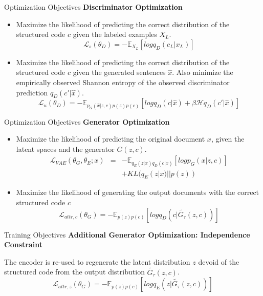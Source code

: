 \documentclass{beamer}
\begin{document}
\begin{frame}{Optimization Objectives}
  \textbf{Discriminator Optimization} 

  \begin{itemize}
    \item Maximize the likelihood of predicting the correct distribution of the structured code $c$ given the labeled examples $X_L$.
    \begin{equation*}
      \mathcal{L}_s(\theta_D) = - \mathbb{E}_{X_L}[log q_D(c_L|x_L)]
    \end{equation*}
    \item Maximize the likelihood of predicting the correct distribution of the structured code $c$ given the generated sentences $\hat{x}$. Also minimize the empirically observed Shannon entropy of the observed discriminator prediction $q_D(c'|\hat{x})$.
    \begin{equation*}
      \mathcal{L}_u(\theta_D) = - \mathbb{E}_{p_G(\hat{x}|z,c)p(z)p(c)} 
      [log q_D(c|\hat{x}) + \beta \mathcal{H} q_D(c'|\hat{x})]
    \end{equation*}
  \end{itemize}
\end{frame}

\begin{frame}{Optimization Objectives}
  \textbf{Generator Optimization}

  \begin{itemize}
    \item Maximize the likelihood of predicting the original document $x$, given the latent spaces and the generator $G(z,c)$.
      \begin{eqnarray*}
        \mathcal{L}_{VAE}(\theta_G, \theta_E; x) &=& 
        - \mathbb{E}_{q_E(z|x)q_D(c|x)}[log p_G(x|z,c)] \\ & & 
        + KL(q_E(z|x)||p(z))
      \end{eqnarray*}
    \item Maximize the likelihood of generating the output documents with the correct structured code $c$
    \begin{equation*}
      \mathcal{L}_{attr, c}(\theta_G) = - \mathbb{E}_{p(z)p(c)} 
      [log q_D(c|\tilde{G_{\tau}}(z,c))]
    \end{equation*}
  \end{itemize}
\end{frame}

\begin{frame}{Training Objectives}
  \textbf{Additional Generator Optimization: Independence Constraint}
  
  The encoder is re-used to regenerate the latent distribution $z$ devoid of the structured code from the output distribution $\tilde{G_{\tau}}(z,c)$. 
  \begin{equation*}
    \mathcal{L}_{attr, z}(\theta_G) = - \mathbb{E}_{p(z)p(c)} 
    [log q_E(z|\tilde{G_{\tau}}(z,c))]
  \end{equation*}
\end{frame}
\end{document}
